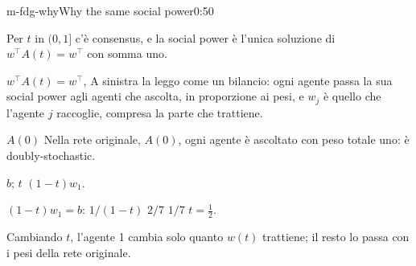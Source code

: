 \begin{slide}{m-fdg-why}{Why the same social power}{0:50 {\color{red}}}
  \begin{discorso}
    \item {\color{blue}Per $t$ in $(0,1]$ c'è consensus, e la social power è l'unica soluzione di $w^\top A(t)=w^\top$ con somma uno.}
    \item {\color{red}   } {\color{red}$w^\top A(t)=w^\top$,} {\color{red}  } {\color{blue}A sinistra la leggo} come un bilancio: ogni agente passa la sua social power agli agenti che ascolta, in proporzione ai pesi, e $w_j$ è quello che l'agente $j$ {\color{red}} {\color{blue}raccoglie, compresa la parte che trattiene.}
    \item {\color{red}$A(0)$} {\color{red} } {\color{blue}Nella rete originale, $A(0)$,} ogni agente è ascoltato con peso totale {\color{red}           } {\color{blue}uno: è doubly-stochastic.}
    \item {\color{red}             } {\color{red}$b$;} {\color{red}    } {\color{red}$t$} {\color{red} } {\color{red}$(1-t)w_1$.}
    \item {\color{red}} {\color{red}$(1-t)w_1=b$:} {\color{red}  } {\color{red}$1/(1-t)$} {\color{red}   } {\color{red}$2/7$} {\color{red}} {\color{red}$1/7$} {\color{red}} {\color{red}$t=\tfrac12$.}
    \item {\color{red}} {\color{blue}Cambiando $t$, l'agente 1 cambia} solo quanto {\color{red}       } {\color{red}$w(t)$} {\color{red}     } {\color{blue}trattiene; il resto lo passa con i pesi della rete originale.}

\end{discorso}
\end{slide}
